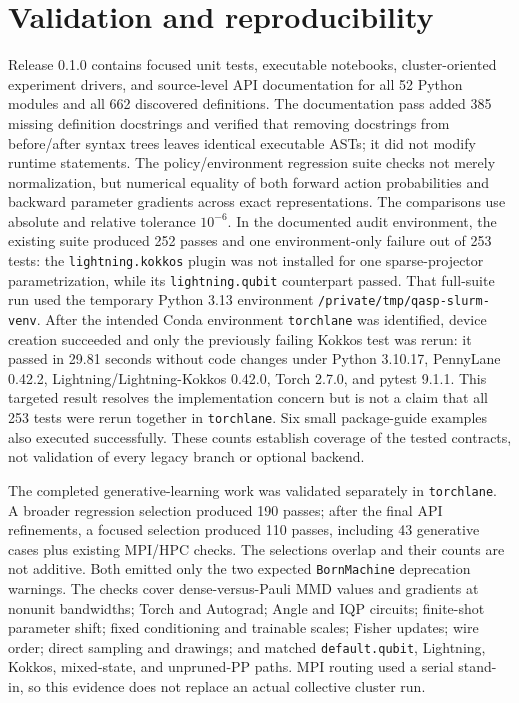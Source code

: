 \documentclass[10pt]{article}
\newcommand{\code}[1]{\texttt{#1}}
\newcommand{\version}{0.1.0}
\begin{document}
\section{Validation and reproducibility}
\label{sec:validation}

Release \version{} contains focused unit tests, executable notebooks,
cluster-oriented experiment drivers, and source-level API documentation for
all 52 Python modules and all 662 discovered definitions.  The documentation
pass added 385 missing definition docstrings and verified that removing
docstrings from before/after syntax trees leaves identical executable ASTs;
it did not modify runtime statements.  The policy/environment regression
suite checks not merely normalization,
but numerical equality of both forward action probabilities and backward
parameter gradients across exact representations.  The comparisons use
absolute and relative tolerance $10^{-6}$.  In the documented audit
environment, the existing suite produced 252 passes and one environment-only
failure out of 253 tests: the \code{lightning.kokkos} plugin was not installed
for one sparse-projector parametrization, while its
\code{lightning.qubit} counterpart passed.  That full-suite run used the
temporary Python 3.13 environment \code{/private/tmp/qasp-slurm-venv}.
After the intended Conda environment \code{torchlane} was identified, device
creation succeeded and only the previously failing Kokkos test was rerun: it
passed in 29.81 seconds without code changes under Python 3.10.17, PennyLane
0.42.2, Lightning/Lightning-Kokkos 0.42.0, Torch 2.7.0, and pytest 9.1.1.
This targeted result resolves the implementation concern but is not a claim
that all 253 tests were rerun together in \code{torchlane}.  Six small
package-guide examples also executed successfully.  These counts establish
coverage of the tested contracts, not validation of every legacy branch or
optional backend.

The completed generative-learning work was validated separately in
\code{torchlane}.  A broader regression selection produced 190 passes; after
the final API refinements, a focused selection produced 110 passes, including
43 generative cases plus existing MPI/HPC checks.  The selections overlap and
their counts are not additive.  Both emitted only the two expected
\code{BornMachine} deprecation warnings.  The checks cover dense-versus-Pauli
MMD values and gradients at nonunit bandwidths; Torch and Autograd; Angle and
IQP circuits; finite-shot parameter shift; fixed conditioning and trainable
scales; Fisher updates; wire order; direct sampling and drawings; and matched
\code{default.qubit}, Lightning, Kokkos, mixed-state, and unpruned-PP paths.
MPI routing used a serial stand-in, so this evidence does not replace an
actual collective cluster run.
\end{document}
